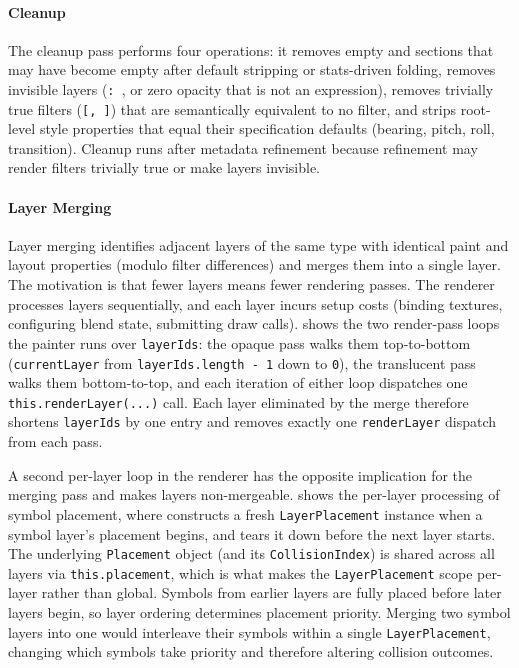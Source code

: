 \paragraph{Cleanup}
The cleanup pass performs four operations: it removes empty  and  sections that may have become empty after default stripping or stats-driven folding, removes invisible layers (\texttt{:~}, or zero opacity that is not an expression), removes trivially true filters (\texttt{[,~]}) that are semantically equivalent to no filter, and strips root-level style properties that equal their specification defaults (bearing, pitch, roll, transition).
Cleanup runs after metadata refinement because refinement may render filters trivially true or make layers invisible.

\paragraph{Layer Merging}
Layer merging identifies adjacent layers of the same type with identical paint and layout properties (modulo filter differences) and merges them into a single layer.
The motivation is that fewer layers means fewer rendering passes.
The renderer processes layers sequentially, and each layer incurs setup costs (binding textures, configuring blend state, submitting draw calls).
 shows the two render-pass loops the painter runs over \texttt{layerIds}: the opaque pass walks them top-to-bottom (\texttt{currentLayer} from \texttt{layerIds.length - 1} down to \texttt{0}), the translucent pass walks them bottom-to-top, and each iteration of either loop dispatches one \texttt{this.renderLayer(...)} call.
Each layer eliminated by the merge therefore shortens \texttt{layerIds} by one entry and removes exactly one \texttt{renderLayer} dispatch from each pass.

A second per-layer loop in the renderer has the opposite implication for the merging pass and makes  layers non-mergeable.  shows the per-layer processing of symbol placement, where  constructs a fresh \texttt{LayerPlacement} instance when a symbol layer's placement begins, and  tears it down before the next layer starts.
The underlying \texttt{Placement} object (and its \texttt{CollisionIndex}) is shared across all layers via \texttt{this.placement}, which is what makes the \texttt{LayerPlacement} scope per-layer rather than global.
Symbols from earlier layers are fully placed before later layers begin, so layer ordering determines placement priority.
Merging two symbol layers into one would interleave their symbols within a single \texttt{LayerPlacement}, changing which symbols take priority and therefore altering collision outcomes.

